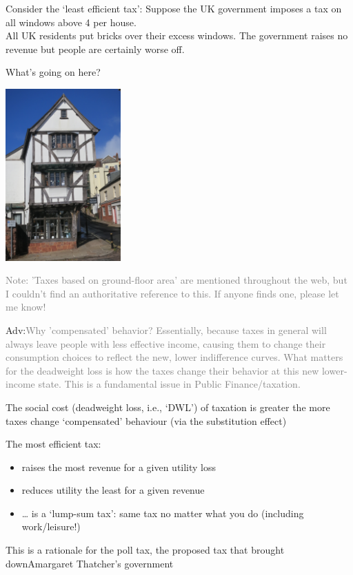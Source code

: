\documentclass[]{article}
\begin{document}
Consider the `least efficient tax': Suppose the UK government imposes a tax on all windows above 4 per house.\\

All UK residents put bricks over their excess windows. The government raises no revenue but people are certainly worse off.

What's going on here?

\includegraphics[height=2.6in]{picsfigs/tudoroverhang.jpg}

\textcolor{gray}{Note: 'Taxes based on ground-floor area' are mentioned throughout the web, but I couldn't find an authoritative reference to this. If anyone finds one, please let me know!}

\textcolor{RawSienna}{Adv:}\textcolor{gray}{Why 'compensated' behavior?  Essentially, because taxes in general will always leave people with less effective income, causing them to change their consumption choices to reflect the new, lower indifference curves. What matters for the deadweight loss is how the taxes change their behavior at this new lower-income state. This is a fundamental issue in Public Finance/taxation.}

The social cost (deadweight loss, i.e., `DWL') of taxation is greater the more taxes change `compensated' behaviour (via the substitution effect)

The most efficient tax:

\begin{itemize}
\item
  raises the most revenue for a given utility loss
\item
  reduces utility the least for a given revenue
\item
  \ldots{} is a `lump-sum tax': same tax no matter what you do (including work/leisure!)
\end{itemize}

This is a rationale for the poll tax, the proposed tax that brought downAmargaret Thatcher's government
\end{document}
